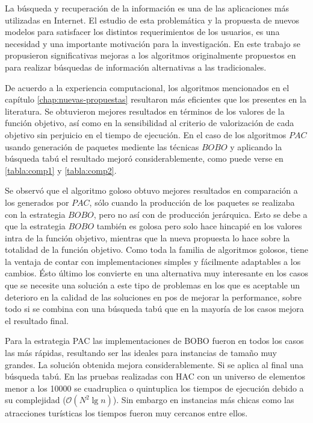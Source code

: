 La búsqueda y recuperación de la información es una de las aplicaciones más utilizadas en Internet. El estudio de esta problemática y la propuesta de nuevos modelos para satisfacer los distintos requerimientos de los usuarios, es una necesidad y una importante motivación para la investigación. En este trabajo se propusieron significativas mejoras a los algoritmos originalmente propuestos en \cite{journals/tkde/Amer-YahiaBCFMZ14} para realizar búsquedas de información alternativas a las tradicionales.

De acuerdo a la experiencia computacional, los algoritmos mencionados en el capítulo \autoref{chap:nuevas-propuestas} resultaron más eficientes que los presentes en la literatura. Se obtuvieron mejores resultados en términos de los valores de la función objetivo, así como en la sensibilidad al criterio de valorización de cada objetivo sin perjuicio en el tiempo de ejecución. En el caso de los algoritmos $PAC$ usando generación de paquetes mediente las técnicas $BOBO$ y aplicando la búsqueda tabú el resultado mejoró considerablemente, como puede verse en \autoref{tabla:comp1} y \autoref{tabla:comp2}.

Se observó que el algoritmo goloso obtuvo mejores resultados en comparación a los generados por $PAC$, sólo cuando la producción de los paquetes se realizaba con la estrategia $BOBO$, pero no así con de producción jerárquica. Esto se debe a que la estrategia $BOBO$ también es golosa pero solo hace hincapié en los valores intra de la función objetivo, mientras que la nueva propuesta lo hace sobre la totalidad de la función objetivo. Como toda la familia de algoritmos golosos, tiene la ventaja de contar con implementaciones simples y fácilmente adaptables a los cambios. Ésto último los convierte en una alternativa muy interesante en los casos que se necesite una solución a este tipo de problemas en los que es aceptable un deterioro en la calidad de las soluciones en pos de mejorar la performance, sobre todo si se combina con una búsqueda tabú que en la mayoría de los casos mejora el resultado final.

Para la estrategia PAC las implementaciones de BOBO fueron en todos los casos las más rápidas, resultando ser las ideales para instancias de tamaño muy grandes. La solución obtenida mejora considerablemente. Si se aplica al final una búsqueda tabú. En las pruebas realizadas con HAC con un universo de elementos menor a los 10000 se cuadruplica o quintuplica los tiempos de ejecución debido a su complejidad ($\mathcal{O}(N^{2}\lg n)$). Sin embargo en instancias más chicas como las atracciones turísticas los tiempos fueron muy cercanos entre ellos.

